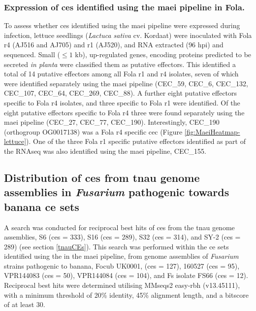 \subsubsection{Expression of \aclp{ce} identified using the \ac{maei} pipeline in \acl{Fola}.}

To assess whether \acp{ce} identified using the \ac{maei} pipeline were expressed during infection, lettuce seedlings (\textit{Lactuca sativa} cv. Kordaat) were inoculated with \ac{Fola} \ac{r4} (AJ516 and AJ705) and \ac{r1} (AJ520), and RNA extracted (96 \ac{hpi}) and sequenced. Small ($ \leq1$ kb), up-regulated genes, encoding proteins predicted to be secreted \textit{in planta} were classified them as putative effectors. This identified a total of 14 putative effectors among all  \ac{Fola} \ac{r1} and \ac{r4} isolates, seven of which  were identified separately using the \ac{maei} pipeline (CEC\_59, CEC\_6, CEC\_132, CEC\_107, CEC\_64, CEC\_269, CEC\_88). A further eight putative effectors specific to \ac{Fola} \ac{r4} isolates, and three specific to \ac{Fola} \ac{r1} were identified. Of the eight putative effectors specific to \ac{Fola} \ac{r4} three were found separately using the \ac{maei} pipeline (CEC\_27, CEC\_77, CEC\_190). Interestingly, CEC\_190 (orthogroup OG0017138) was a \ac{Fola} \ac{r4} specific \ac{cec} (Figure \ref{fig:MaeiHeatmap-lettuce}). One of the three \ac{Fola} \ac{r1} specific putative effectors identified as part of the RNAseq was also identified using the \ac{maei} pipeline, CEC\_155. 

\subsection{Distribution of \aclp{ce} from \ac{tnau} genome assemblies in \textit{Fusarium} pathogenic towards banana \ac{ce} sets}
\label{sec:Chap3RNASeq}

A search was conducted for reciprocal best hits of \acp{ce} from the \ac{tnau} genome assemblies, S6 (\acp{ce} = 333), S16  (\acp{ce} = 289), S32 (\acp{ce} = 314), and SY-2 (\acp{ce} = 289) (see section \ref{tnauCEs}). This search was performed within the \ac{ce} sets identified using the in the \ac{maei} pipeline, from genome assemblies of \textit{Fusarium} strains pathogenic to banana, \ac{Focub} UK0001, (\acp{ce} = 127), 160527 (\acp{ce} = 95), VPR144083 (\acp{ce} = 50), VPR144084 (\acp{ce} = 104), and \ac{Fs} isolate FS66 (\acp{ce} = 12). Reciprocal best hits were determined utilising MMseqs2 easy-rbh (v13.45111), with a minimum threshold of 20\% identity, 45\% alignment length, and a bitscore of at least 30. 

